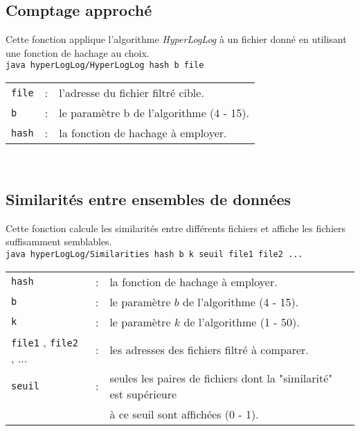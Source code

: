 \documentclass[12pt,a4paper,titlepage]{article}
\newcommand{\code}[1]{ \texttt{\footnotesize #1} }
\begin{document}
\subsection{Comptage approché}
Cette fonction applique l'algorithme \emph{HyperLogLog} à un fichier donné en utilisant une fonction de hachage au choix.\\
\indent\indent\code{java hyperLogLog/HyperLogLog hash b file}\\
\begin{tabular}{lcl}
\code{file} &:& l'adresse du fichier filtré cible.\\
\code{b} &:& le paramètre b de l'algorithme (4 - 15).\\
\code{hash} &:& la fonction de hachage à employer.
\end{tabular}\\


\subsection{Similarités entre ensembles de données}
Cette fonction calcule les similarités entre différents fichiers et affiche les fichiers suffisamment semblables. \\
\indent\indent\code{java hyperLogLog/Similarities hash b k seuil file1 file2 ...}\\
\begin{tabular}{lcl}
\code{hash} &:& la fonction de hachage à employer.\\
\code{b} &:& le paramètre $b$ de l'algorithme (4 - 15).\\
\code{k} &:& le paramètre $k$ de l'algorithme (1 - 50).\\
\code{file1}, \code{file2}, ... &:& les adresses des fichiers filtré à comparer.\\
\code{seuil} &:& seules les paires de fichiers dont la "similarité" est supérieure\\
&& à ce seuil sont affichées (0 - 1).
\end{tabular}\\
\end{document}
